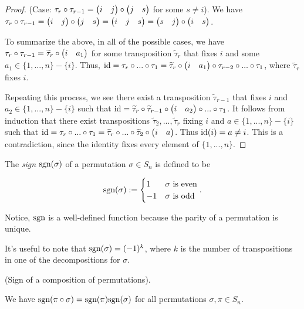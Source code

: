 \begin{proof}
{{            \fullindent
            {
                (Case: $\tau_r \circ \tau_{r - 1} = \begin{pmatrix} i & j \end{pmatrix} \circ \begin{pmatrix} j & s \end{pmatrix}$ for some $s \neq i$). We have $\tau_r \circ \tau_{r - 1} = \begin{pmatrix} i & j \end{pmatrix} \circ \begin{pmatrix} j & s \end{pmatrix} = \begin{pmatrix} i & j & s \end{pmatrix} = \begin{pmatrix} s & j \end{pmatrix} \circ \begin{pmatrix} i & s \end{pmatrix}$.
            }
        }
    }

    \newcommand{\tttau}{\widetilde{\tau}}
            
    To summarize the above, in all of the possible cases, we have $\tau_r \circ \tau_{r - 1} = \tttau_r \circ \transp{i}{a_1}$ for some transposition $\tttau_r$ that fixes $i$ and some $a_1 \in \{1, ..., n\} - \{i\}$. Thus, $\id = \tau_r \circ ... \circ \tau_1 = \tttau_r \circ \transp{i}{a_1} \circ \tau_{r - 2} \circ ... \circ \tau_1$, where $\tttau_r$ fixes $i$.
    
    Repeating this process, we see there exist a transposition $\tttau_{r - 1}$ that fixes $i$ and $a_2 \in \{1, ..., n\} - \{i\}$ such that $\id = \tttau_r \circ \tttau_{r - 1} \circ \transp{i}{a_2} \circ ... \circ \tau_1$. It follows from induction that there exist transpositions $\tttau_2, ..., \tttau_r$ fixing $i$ and $a \in \{1, ..., n\} - \{i\}$ such that $\id = \tau_r \circ ... \circ \tau_1 = \tttau_r \circ ... \circ \tttau_2 \circ \transp{i}{a}$. Thus $\text{id}(i) = a \neq i$. This is a contradiction, since the identity fixes every element of $\{1, ..., n\}$.
\end{proof}

\begin{defn}
    The \textit{sign} $\text{sgn}(\sigma)$ of a permutation $\sigma \in S_n$ is defined to be
    
    \begin{align*}
        \text{sgn}(\sigma) := 
        \begin{cases}
            1 & \text{$\sigma$ is even} \\
            -1 & \text{$\sigma$ is odd}
        \end{cases}.
    \end{align*}

    Notice, $\text{sgn}$ is a well-defined function because the parity of a permutation is unique.

    It's useful to note that $\text{sgn}(\sigma) = (-1)^k$, where $k$ is the number of transpositions in one of the decompositions for $\sigma$.
\end{defn}

\begin{theorem}
    (Sign of a composition of permutations).

    We have $\text{sgn}(\pi \circ \sigma) = \text{sgn}(\pi) \text{sgn}(\sigma)$ for all permutations $\sigma, \pi \in S_n$.
\end{theorem}

